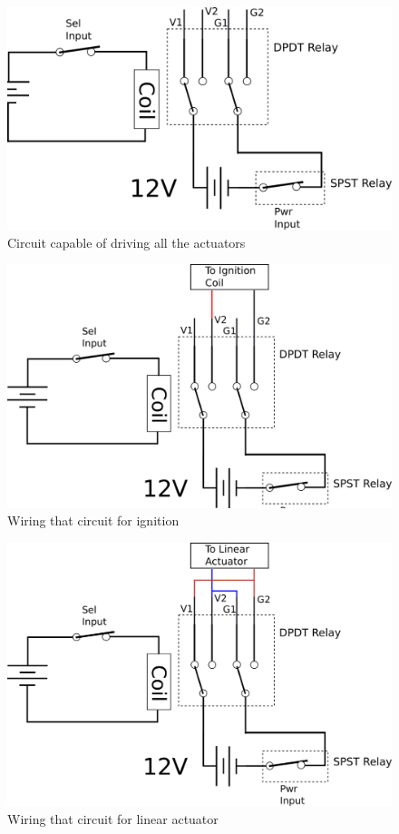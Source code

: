 \documentclass[11pt]{article}
\begin{document}
\begin{figure}[htbp]
\centering
\includegraphics[width=.9\linewidth]{./images/pcb_general.png}
\caption{\label{fig:orgb4106d3}
Circuit capable of driving all the actuators}
\end{figure}

\begin{figure}[htbp]
\centering
\includegraphics[width=.9\linewidth]{./images/pcb_ignition.png}
\caption{\label{fig:org802ef6e}
Wiring that circuit for ignition}
\end{figure}

\begin{figure}[htbp]
\centering
\includegraphics[width=.9\linewidth]{./images/pcb_linear_act.png}
\caption{\label{fig:orge1027c0}
Wiring that circuit for linear actuator}
\end{figure}
\end{document}
